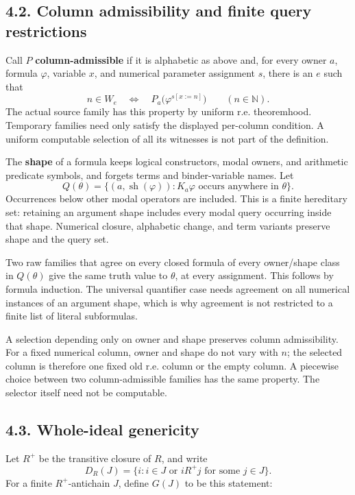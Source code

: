 \documentclass[
  11pt,
  letterpaper,
]{article}
\begin{document}
\subsection{4.2. Column admissibility and finite query
restrictions}\label{column-admissibility-and-finite-query-restrictions}

Call \(P\) \textbf{column-admissible} if it is alphabetic as above and,
for every owner \(a\), formula \(\varphi\), variable \(x\), and
numerical parameter assignment \(s\), there is an \(e\) such that \[
n\in W_e
\quad\Longleftrightarrow\quad
P_a\bigl(\varphi^{s[x:=n]}\bigr)
\qquad(n\in\mathbb N).
\tag{F2}
\] The actual source family has this property by uniform r.e.
theoremhood. Temporary families need only satisfy the displayed
per-column condition. A uniform computable selection of all its
witnesses is not part of the definition.

The \textbf{shape} of a formula keeps logical constructors, modal
owners, and arithmetic predicate symbols, and forgets terms and
binder-variable names. Let \[
Q(\theta)=
\{(a,\operatorname{sh}(\varphi)):
       K_a\varphi\text{ occurs anywhere in }\theta\}.
\tag{F3}
\] Occurrences below other modal operators are included. This is a
finite hereditary set: retaining an argument shape includes every modal
query occurring inside that shape. Numerical closure, alphabetic change,
and term variants preserve shape and the query set.

Two raw families that agree on every closed formula of every owner/shape
class in \(Q(\theta)\) give the same truth value to \(\theta\), at every
assignment. This follows by formula induction. The universal quantifier
case needs agreement on all numerical instances of an argument shape,
which is why agreement is not restricted to a finite list of literal
subformulas.

A selection depending only on owner and shape preserves column
admissibility. For a fixed numerical column, owner and shape do not vary
with \(n\); the selected column is therefore one fixed old r.e. column
or the empty column. A piecewise choice between two column-admissible
families has the same property. The selector itself need not be
computable.

\subsection{4.3. Whole-ideal genericity}\label{whole-ideal-genericity}

Let \(R^+\) be the transitive closure of \(R\), and write \[
D_R(J)=\{i:i\in J\text{ or }iR^+j\text{ for some }j\in J\}.
\] For a finite \(R^+\)-antichain \(J\), define \(G(J)\) to be this
statement:
\end{document}
